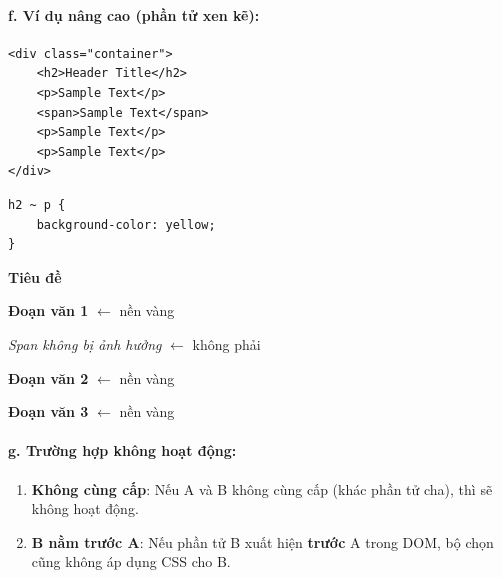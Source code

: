 \paragraph{f. Ví dụ nâng cao (phần tử xen kẽ):}
\begin{codeWindow}
\begin{lstlisting}[language=HTML5]
<div class="container">
    <h2>Header Title</h2>
    <p>Sample Text</p>
    <span>Sample Text</span>
    <p>Sample Text</p>
    <p>Sample Text</p>
</div>
\end{lstlisting}

\begin{lstlisting}[language=CSS3]
h2 ~ p {
    background-color: yellow;
}
\end{lstlisting}
\end{codeWindow}

\begin{browserWindow}
\sffamily\small
\begin{tcolorbox}[arc=2pt, colback=primaryBlue!5, colframe=primaryBlue!40, boxrule=1pt, title={\sffamily\small\color{white}\textbf{.container}}, colbacktitle=primaryBlue!70]
{\bfseries\large\textcolor{darkText}{Tiêu đề}} \par\vspace{4pt}
\colorbox{yellow!60}{\textbf{Đoạn văn 1}} {\small\textcolor{gray!60}{$\leftarrow$ nền vàng}} \par\vspace{3pt}
\textcolor{darkText}{\textit{Span không bị ảnh hưởng}} {\small\textcolor{gray!60}{$\leftarrow$ không phải }} \par\vspace{3pt}
\colorbox{yellow!60}{\textbf{Đoạn văn 2}} {\small\textcolor{gray!60}{$\leftarrow$ nền vàng}} \par\vspace{3pt}
\colorbox{yellow!60}{\textbf{Đoạn văn 3}} {\small\textcolor{gray!60}{$\leftarrow$ nền vàng}}
\end{tcolorbox}
\end{browserWindow}

\paragraph{g. Trường hợp không hoạt động:}

\begin{warnBox}
\begin{enumerate}[leftmargin=1.5em, itemsep=3pt, parsep=0pt]
    \item \textbf{Không cùng cấp}: Nếu A và B không cùng cấp (khác phần tử cha), thì \codeinline{\textasciitilde{}} sẽ không hoạt động.
    \item \textbf{B nằm trước A}: Nếu phần tử B xuất hiện \textbf{trước} A trong DOM, bộ chọn cũng không áp dụng CSS cho B.
\end{enumerate}
\end{warnBox}

